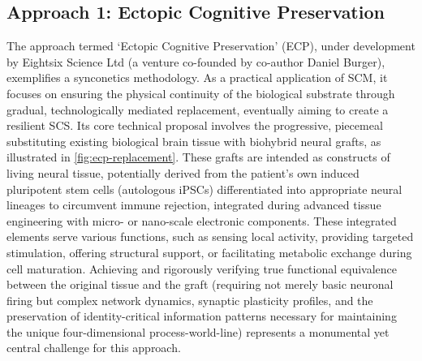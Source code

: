 \documentclass[10pt]{article}
\begin{document}
\begin{sloppypar}
  \subsection{Approach 1: Ectopic Cognitive Preservation}
  \label{sec:daniel-approach}

  The approach termed ‘Ectopic Cognitive Preservation’ (ECP), under development by Eightsix Science Ltd (a venture co-founded by co-author Daniel Burger), exemplifies a synconetics methodology. As a practical application of SCM, it focuses on ensuring the physical continuity of the biological substrate through gradual, technologically mediated replacement, eventually aiming to create a resilient SCS. Its core technical proposal involves the progressive, piecemeal substituting existing biological brain tissue with biohybrid neural grafts, as illustrated in \autoref{fig:ecp-replacement}. These grafts are intended as constructs of living neural tissue, potentially derived from the patient’s own induced pluripotent stem cells (autologous iPSCs) differentiated into appropriate neural lineages to circumvent immune rejection, integrated during advanced tissue engineering with micro- or nano-scale electronic components. These integrated elements serve various functions, such as sensing local activity, providing targeted stimulation, offering structural support, or facilitating metabolic exchange during cell maturation. Achieving and rigorously verifying true functional equivalence between the original tissue and the graft (requiring not merely basic neuronal firing but complex network dynamics, synaptic plasticity profiles, and the preservation of identity-critical information patterns necessary for maintaining the unique four-dimensional process-world-line) represents a monumental yet central challenge for this approach.


\end{sloppypar}
\end{document}
